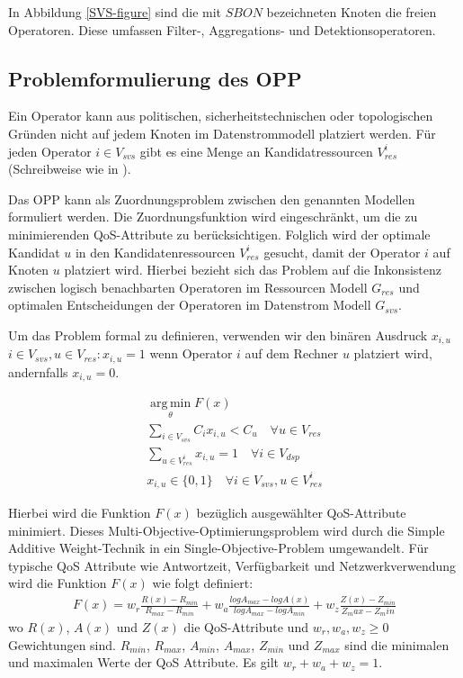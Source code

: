 \documentclass{article}
\begin{document}
In Abbildung \ref{SVS-figure} sind die mit $SBON$ bezeichneten Knoten die freien Operatoren. Diese umfassen Filter-, Aggregations- und Detektionsoperatoren.

\subsection{Problemformulierung des OPP} \label{OPP-Definition}
Ein Operator kann aus politischen, sicherheitstechnischen oder topologischen Gründen \cite{cardellini-optimal_operatorplc} nicht auf jedem Knoten im Datenstrommodell platziert werden. 
Für jeden Operator $i \in V_{svs}$ gibt es eine Menge an Kandidatressourcen $V_{res}^i$ (Schreibweise wie in \cite{efficient-operator-placement}).

Das OPP kann als Zuordnungsproblem zwischen den genannten Modellen formuliert werden. 
Die Zuordnungsfunktion wird eingeschränkt, um die zu minimierenden QoS-Attribute zu berücksichtigen. 
Folglich wird der optimale Kandidat $u$ in den Kandidatenressourcen $V_{res}^i$
gesucht, damit der Operator $i$ auf Knoten $u$ platziert wird.
Hierbei bezieht sich das Problem auf die Inkonsistenz zwischen 
logisch benachbarten Operatoren im Ressourcen Modell $G_{res}$ und optimalen Entscheidungen der Operatoren im Datenstrom Modell $G_{svs}$.

Um das Problem formal zu definieren, verwenden wir den binären Ausdruck $x_{i,u}$ $i \in V_{svs}, u \in V_{res}: x_{i,u} = 1$ wenn Operator $i$
auf dem Rechner $u$ platziert wird, andernfalls $x_{i,u} = 0$.

\[ 
    \begin{gathered}
        \operatorname*{arg\,min}_\theta F(x) \\
        \sum_{i \in V_{svs}} C_i x_{i,u} < C_u \quad \forall u \in V_{res} \\ %
        \sum_{u \in V_{res}^i} x_{i,u} = 1 \quad \forall i \in V_{dsp} \\ %
        x_{i,u} \in \{0,1\} \quad \forall i \in V_{svs}, u \in V_{res}^i
    \end{gathered}
\] 

Hierbei wird die Funktion $F(x)$ bezüglich ausgewählter QoS-Attribute minimiert. 
Dieses Multi-Objective-Optimierungsproblem wird durch die Simple Additive Weight-Technik \cite{yoon-multiple-optimization} in ein Single-Objective-Problem umgewandelt.
Für typische QoS Attribute wie Antwortzeit, Verfügbarkeit und Netzwerkverwendung \cite{efficient-operator-placement} wird die Funktion $F(x)$ wie folgt definiert:
\[ 
    \begin{gathered}
        F(x) = w_r \frac{R(x) - R_{min}}{R_{max} - R_{min}} 
        + w_a \frac{log A_{max} - log A(x)}{log A_{max} - log A_{min}} 
        + w_z \frac{Z(x) - Z_{min}}{Z_max - Z_min} 
    \end{gathered}  \label{to-miminize-function}
\] 
wo $R(x)$, $A(x)$ und $Z(x)$ die QoS-Attribute und $w_r, w_a, w_z \geq 0$ Gewichtungen sind. $R_{min}$, $R_{max}$, $A_{min}$, $A_{max}$, $Z_{min}$ und $Z_{max}$ sind die minimalen und maximalen Werte der QoS Attribute.
Es gilt $w_r + w_a + w_z = 1$.
\end{document}
